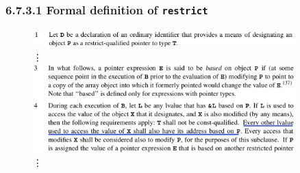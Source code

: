 \begin{frame}
\frametitle{\textbf{6.7.3.1 Formal definition of} \texttt{restrict}}
\begin{figure}
\centering
{
\includegraphics[width=0.9\textwidth]{restrict-definition-1.png}
}
{
\\
\qquad \vdots
\\
}
{
\includegraphics[width=0.9\textwidth]{restrict-definition-3-4-annotation-defined.png}
}
{
\\
\qquad \vdots
}
\end{figure}
\end{frame}


